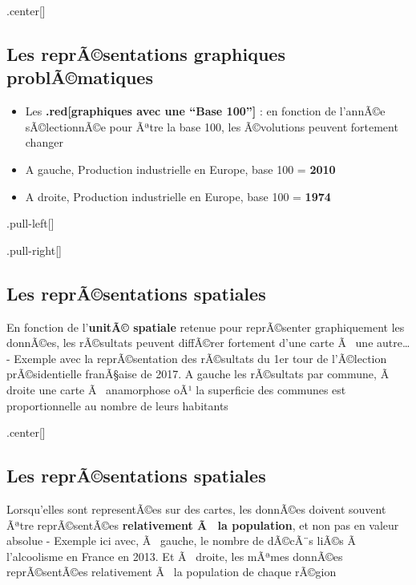 \documentclass[]{article}
\providecommand{\tightlist}{%
  \setlength{\itemsep}{0pt}\setlength{\parskip}{0pt}}
\begin{document}
.center{[}\href{https://twitter.com/maxcroser/status/857389434756505600}{}{]}

\subsection{Les reprÃ©sentations graphiques
problÃ©matiques}\label{les-reprasentations-graphiques-problamatiques-2}

\begin{itemize}
\tightlist
\item
  Les \textbf{.red{[}graphiques avec une ``Base 100''{]}} : en fonction
  de l'annÃ©e sÃ©lectionnÃ©e pour Ãªtre la base 100, les Ã©volutions
  peuvent fortement changer
\item
  A gauche, Production industrielle en Europe, base 100 = \textbf{2010}
\item
  A droite, Production industrielle en Europe, base 100 = \textbf{1974}
\end{itemize}

.pull-left{[}{]}

.pull-right{[}{]}

\subsection{Les reprÃ©sentations
spatiales}\label{les-reprasentations-spatiales}

En fonction de l'\textbf{unitÃ© spatiale} retenue pour reprÃ©senter
graphiquement les donnÃ©es, les rÃ©sultats peuvent diffÃ©rer fortement
d'une carte Ã~ une autre\ldots{} - Exemple avec la reprÃ©sentation des
rÃ©sultats du 1er tour de l'Ã©lection prÃ©sidentielle franÃ§aise de
2017. A gauche les rÃ©sultats par commune, Ã~ droite une carte Ã~
anamorphose oÃ¹ la superficie des communes est proportionnelle au nombre
de leurs habitants

.center{[}\href{https://www.populationdata.net/cartes/france-elections-presidentielles-2017-1er-tour/}{}{]}

\subsection{Les reprÃ©sentations
spatiales}\label{les-reprasentations-spatiales-1}

Lorsqu'elles sont representÃ©es sur des cartes, les donnÃ©es doivent
souvent Ãªtre reprÃ©sentÃ©es \textbf{relativement Ã~ la population}, et
non pas en valeur absolue - Exemple ici avec, Ã~ gauche, le nombre de
dÃ©cÃ¨s liÃ©s Ã~ l'alcoolisme en France en 2013. Et Ã~ droite, les
mÃªmes donnÃ©es reprÃ©sentÃ©es relativement Ã~ la population de chaque
rÃ©gion
\end{document}
